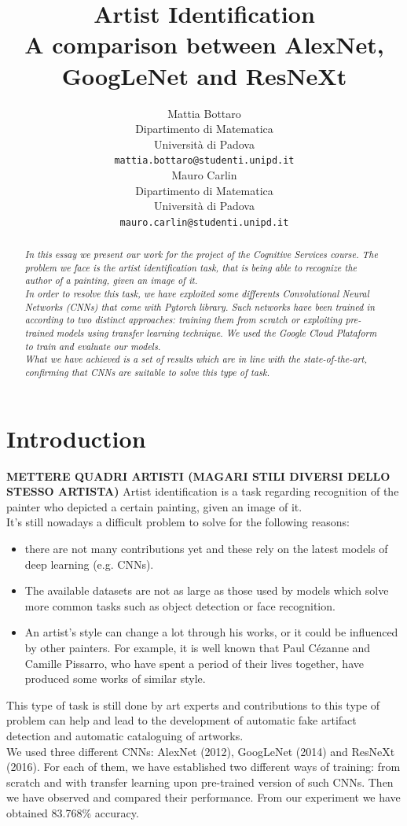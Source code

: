 \documentclass{article}
\title{Artist Identification	\\  A comparison between AlexNet, GoogLeNet and ResNeXt}
\author{
  Mattia Bottaro \\
  Dipartimento  di Matematica\\
  Università di Padova \\
  \texttt{mattia.bottaro@studenti.unipd.it} \\
   \And
  Mauro Carlin \\
Dipartimento  di Matematica\\
Università di Padova \\
\texttt{mauro.carlin@studenti.unipd.it} \\
}
\begin{document}
\maketitle

\begin{abstract}
	\textit{In this essay we present our work for the project of the Cognitive Services course.
	The problem we face is the artist identification task, that is being able to recognize the author of a painting, given an image of it.\\
	In order to resolve this task, we have exploited some differents Convolutional Neural Networks (CNNs) that come with \textit{Pytorch} library. Such networks have been trained in according to two distinct approaches: training them from scratch or exploiting pre-trained models using transfer learning technique. We used the \textit{Google Cloud Plataform} to train and evaluate our models.\\
	What we have achieved is a set of results which are in line with the  state-of-the-art, confirming that CNNs are suitable to solve this type of task.}
\end{abstract}




\section{Introduction}
\textbf{METTERE QUADRI ARTISTI (MAGARI STILI DIVERSI DELLO STESSO ARTISTA)}
Artist identification is a task regarding recognition of the painter who depicted a certain painting, given an image of it.\\
It's still nowadays a difficult problem to solve for the following reasons:
\begin{itemize}
	\item there are not many contributions yet and these rely on the latest models of deep learning (e.g. CNNs). 
	\item The available datasets are not as large as those used by models which solve more common tasks such as object detection or face recognition.
	\item An artist's style can change a lot through his works, or it could be influenced by other painters. For example, it is well known that Paul Cézanne and Camille Pissarro, who have spent a period of their lives together, have produced some works of similar style.
\end{itemize}
This type of task is still done by art experts and contributions to this type of problem can help and lead to the development of automatic fake artifact detection and automatic cataloguing of artworks.\\
We used three different CNNs: AlexNet (2012), GoogLeNet (2014) and ResNeXt (2016). For each of them, we have established two different ways of training: from scratch and with transfer learning  upon pre-trained version of such CNNs. Then we have observed and compared their performance. From our experiment we have obtained 83.768\% accuracy.\\
\end{document}
